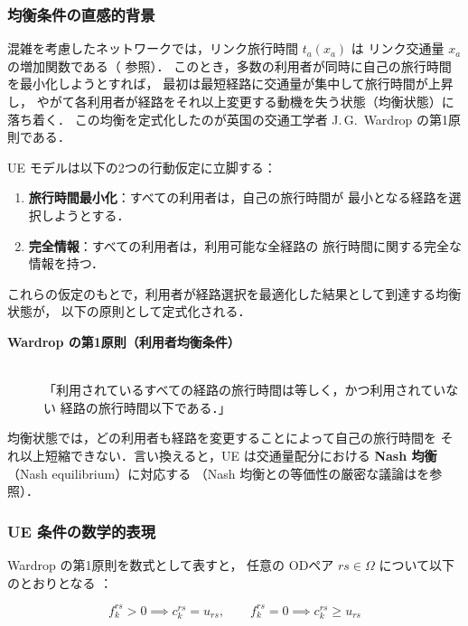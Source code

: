 \subsubsection*{均衡条件の直感的背景}

混雑を考慮したネットワークでは，リンク旅行時間 $t_a(x_a)$ は
リンク交通量 $x_a$ の増加関数である（  参照）．
このとき，多数の利用者が同時に自己の旅行時間を最小化しようとすれば，
最初は最短経路に交通量が集中して旅行時間が上昇し，
やがて各利用者が経路をそれ以上変更する動機を失う状態（均衡状態）に落ち着く．
この均衡を定式化したのが英国の交通工学者 J.\,G.\ Wardrop の第1原則である\cite{Wardrop1952}．

UE モデルは以下の2つの行動仮定に立脚する：

\begin{enumerate}
  \item \textbf{旅行時間最小化}：すべての利用者は，自己の旅行時間が
        最小となる経路を選択しようとする．
  \item \textbf{完全情報}：すべての利用者は，利用可能な全経路の
        旅行時間に関する完全な情報を持つ．
\end{enumerate}

これらの仮定のもとで，利用者が経路選択を最適化した結果として到達する均衡状態が，
以下の原則として定式化される．

\begin{description}
  \item[\textbf{Wardrop の第1原則（利用者均衡条件）}] \mbox{}\\
    「利用されているすべての経路の旅行時間は等しく，かつ利用されていない
    経路の旅行時間以下である．」
\end{description}

均衡状態では，どの利用者も経路を変更することによって自己の旅行時間を
それ以上短縮できない．言い換えると，UE は交通量配分における
\textbf{Nash 均衡}（Nash equilibrium）に対応する
\cite{Nash1950,Nash1951}
（Nash 均衡との等価性の厳密な議論はを参照）．

\subsubsection*{UE 条件の数学的表現}

Wardrop の第1原則を数式として表すと，
任意の ODペア $rs \in \Omega$ について以下のとおりとなる
\cite{Beckmann1956,Sheffi1985}：

\begin{equation}
  f_k^{rs} > 0  \implies  c_k^{rs} = u_{rs},
  \qquad
  f_k^{rs} = 0  \implies  c_k^{rs} \geq u_{rs}
  \label{eq:wardrop-condition}
\end{equation}

